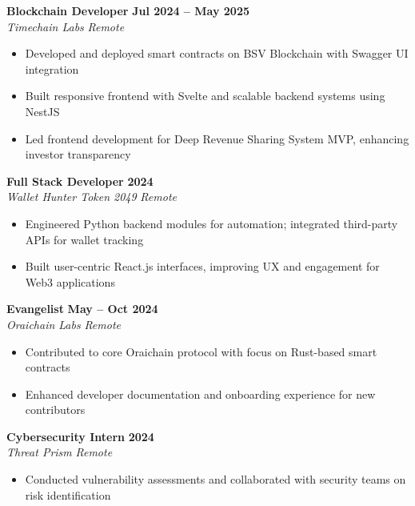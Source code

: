 \documentclass[11pt,a4paper]{article}
\begin{document}
\noindent \textbf{Blockchain Developer} \hfill \textbf{Jul 2024 -- May 2025} \\
\textit{Timechain Labs} \hfill \textit{Remote}
\begin{itemize}[leftmargin=1.5em, itemsep=1pt, parsep=0pt, topsep=1.5pt]
  \item Developed and deployed smart contracts on BSV Blockchain with Swagger UI integration
  \item Built responsive frontend with Svelte and scalable backend systems using NestJS
  \item Led frontend development for Deep Revenue Sharing System MVP, enhancing investor transparency
\end{itemize}
\vspace{2.5pt}

\noindent \textbf{Full Stack Developer} \hfill \textbf{2024} \\
\textit{Wallet Hunter Token 2049} \hfill \textit{Remote}
\begin{itemize}[leftmargin=1.5em, itemsep=1pt, parsep=0pt, topsep=1.5pt]
  \item Engineered Python backend modules for automation; integrated third-party APIs for wallet tracking
  \item Built user-centric React.js interfaces, improving UX and engagement for Web3 applications
\end{itemize}
\vspace{2.5pt}

\noindent \textbf{Evangelist} \hfill \textbf{May -- Oct 2024} \\
\textit{Oraichain Labs} \hfill \textit{Remote}
\begin{itemize}[leftmargin=1.5em, itemsep=1pt, parsep=0pt, topsep=1.5pt]
  \item Contributed to core Oraichain protocol with focus on Rust-based smart contracts
  \item Enhanced developer documentation and onboarding experience for new contributors
\end{itemize}
\vspace{2.5pt}

\noindent \textbf{Cybersecurity Intern} \hfill \textbf{2024} \\
\textit{Threat Prism} \hfill \textit{Remote}
\begin{itemize}[leftmargin=1.5em, itemsep=1pt, parsep=0pt, topsep=1.5pt]
  \item Conducted vulnerability assessments and collaborated with security teams on risk identification
\end{itemize}
\end{document}
